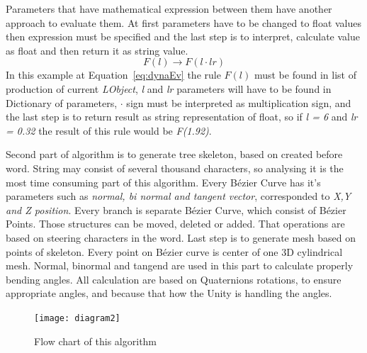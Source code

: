 \documentclass[b5paper,twoside,11pt]{article}
\begin{document}
\newpage
Parameters that have mathematical expression between them have another approach to evaluate them. At first parameters have to be changed to float values then expression must be specified and the last step is to interpret, calculate value as float and then return it as string value.
  \begin{equation}\label{eq:dynaEv}
  F(l) \rightarrow F(l \cdot lr)
  \end{equation}
  In this example at Equation~\ref{eq:dynaEv} the rule $F(l)$ must be found in list of production of current \textit{LObject}, \textit{l} and \textit{lr} parameters will have to be found in Dictionary of parameters, $ \cdot$ sign must be interpreted as multiplication sign, and the last step is to return result as string representation of float, so if \textit{l = 6} and \textit{lr = 0.32} the result of this rule would be \textit{F(1.92)}.\par
Second part of algorithm is to generate tree skeleton, based on created before word. String may consist of several thousand characters, so analysing it is the most time consuming part of this algorithm.
Every Bézier Curve has it's parameters such as \textit{normal, bi normal and tangent vector}, corresponded to \textit{X,Y and Z position}. Every branch is separate Bézier Curve, which consist of Bézier Points. Those structures can be moved, deleted or added. That operations are based on steering characters in the word.	
Last step is to generate  mesh based on points of skeleton. Every point on Bézier curve is center of one 3D cylindrical mesh. Normal, binormal and tangend are used in this part to calculate properly bending angles.
All calculation are based on Quaternions rotations, to ensure appropriate angles, and because that how the Unity is handling the angles.
\begin{figure}[!htp]
\centering
  \texttt{[image: diagram2]}
\caption{Flow chart of this algorithm \label{diagram}}
\end{figure}
\end{document}
